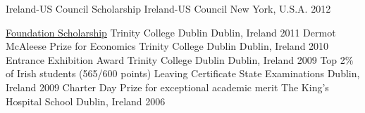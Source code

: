   
    \begin{cvhonors}
       
       \cvhonor
        {Ireland-US Council Scholarship}
        {Ireland-US Council}
        {New York, U.S.A.}
        {2012}
      
      \cvhonor
        {\href{https://en.wikipedia.org/wiki/Trinity_College,_Dublin\#Scholarship}{\textcolor{awesome-skyblue}{Foundation Scholarship}}}
        {Trinity College Dublin}
        {Dublin, Ireland}
        {2011}
      \cvhonor
        {Dermot McAleese Prize for Economics}
        {Trinity College Dublin}
        {Dublin, Ireland}
        {2010}
      \cvhonor
        {Entrance Exhibition Award}
        {Trinity College Dublin}
        {Dublin, Ireland}
        {2009}
    \cvhonor
        {Top 2\% of Irish students (565/600 points)}
        {Leaving Certificate State Examinations}
        {Dublin, Ireland}
        {2009}
      \cvhonor
        {Charter Day Prize for exceptional academic merit}
        {The King's Hospital School}
        {Dublin, Ireland}
        {2006}
    \end{cvhonors}

  


 
   